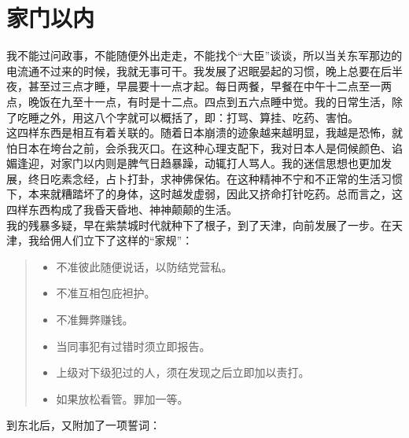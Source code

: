 \fancyhead[RO]{} %
\fancyhead[LE]{} %
\chapter*{家门以内}
\thispagestyle{empty}
我不能过问政事，不能随便外出走走，不能找个“大臣”谈谈，所以当关东军那边的电流通不过来的时候，我就无事可干。我发展了迟眠晏起的习惯，晚上总要在后半夜，甚至过三点才睡，早晨要十一点才起。每日两餐，早餐在中午十二点至一两点，晚饭在九至十一点，有时是十二点。四点到五六点睡中觉。我的日常生活，除了吃睡之外，用这八个字就可以概括了，即：打骂、算挂、吃药、害怕。\\

这四样东西是相互有着关联的。随着日本崩溃的迹象越来越明显，我越是恐怖，就怕日本在垮台之前，会杀我灭口。在这种心理支配下，我对日本人是伺候颜色、谄媚逢迎，对家门以内则是脾气日趋暴躁，动辄打人骂人。我的迷信思想也更加发展，终日吃素念经，占卜打卦，求神佛保佑。在这种精神不宁和不正常的生活习惯下，本来就糟踏坏了的身体，这时越发虚弱，因此又挤命打针吃药。总而言之，这四样东西构成了我昏天昏地、神神颠颠的生活。\\

我的残暴多疑，早在紫禁城时代就种下了根子，到了天津，向前发展了一步。在天津，我给佣人们立下了这样的“家规”：\\

\begin{quote}
	\begin{itemize}
		\item 不准彼此随便说话，以防结党营私。\\
		\item 不准互相包庇袒护。\\
		\item 不准舞弊赚钱。\\
		\item 当同事犯有过错时须立即报告。\\
		\item 上级对下级犯过的人，须在发现之后立即加以责打。\\
		\item 如果放松看管。罪加一等。\\
	\end{itemize}
\end{quote}

到东北后，又附加了一项誓词：\\

